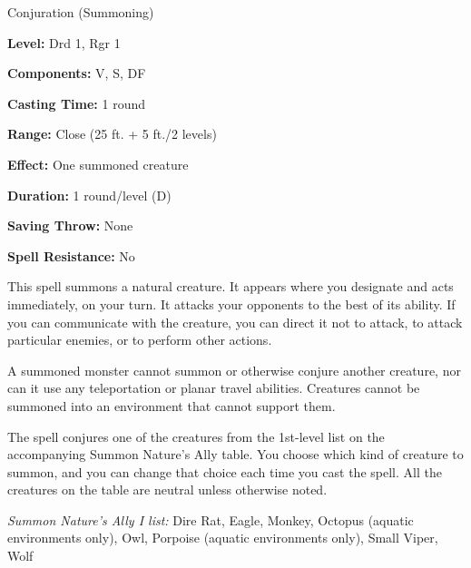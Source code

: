 
Conjuration (Summoning)

\textbf{Level:} Drd 1, Rgr 1

\textbf{Components:} V, S, DF

\textbf{Casting Time:} 1 round

\textbf{Range:} Close (25 ft. + 5 ft./2 levels)

\textbf{Effect:} One summoned creature

\textbf{Duration:} 1 round/level (D)

\textbf{Saving Throw:} None

\textbf{Spell Resistance:} No

This spell summons a natural creature. It appears where you designate and acts 
immediately, on your turn. It attacks your opponents to the best of its ability. 
If you can communicate with the creature, you can direct it not to attack, to attack 
particular enemies, or to perform other actions.

A summoned monster cannot summon or otherwise conjure another creature, nor can 
it use any teleportation or planar travel abilities. Creatures cannot be summoned 
into an environment that cannot support them.

The spell conjures one of the creatures from the 1st-level list on the accompanying 
Summon Nature's Ally table. You choose which kind of creature to summon, and you 
can change that choice each time you cast the spell. All the creatures on the table 
are neutral unless otherwise noted.

\textit{Summon Nature's Ally I list:} Dire Rat, Eagle, Monkey, Octopus (aquatic environments only), Owl, Porpoise (aquatic environments only), Small Viper, Wolf
